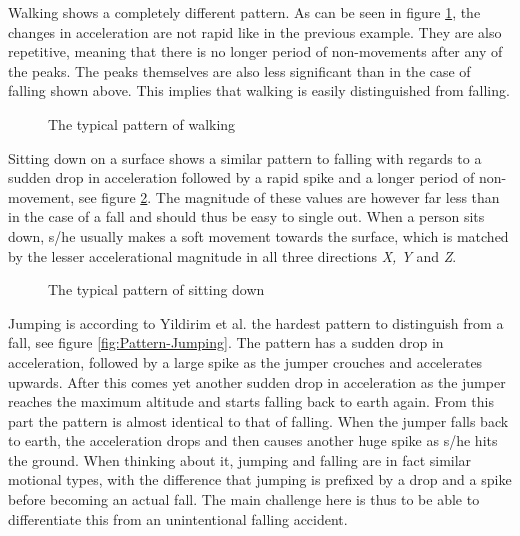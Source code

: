 \documentclass[12pt, a4paper, onecolumn]{article}
\begin{document}
	
	Walking shows a completely different pattern. As can be seen in figure \ref{fig:Pattern-Walking}, the changes in acceleration are not rapid like in the previous example. They are also repetitive, meaning that there is no longer period of non-movements after any of the peaks. The peaks themselves are also less significant than in the case of falling shown above. This implies that walking is easily distinguished from falling.
	
	\begin{figure}[H]
		\centering
		\caption{The typical pattern of walking}%
		\label{fig:Pattern-Walking}%
	\end{figure}
	
	
	 Sitting down on a surface shows a similar pattern to falling with regards to a sudden drop in acceleration followed by a rapid spike and a longer period of non-movement, see figure \ref{fig:Pattern-Sittin}. The magnitude of these values are however far less than in the case of a fall and should thus be easy to single out. When a person sits down, s/he usually makes a soft movement towards the surface, which is matched by the lesser accelerational magnitude in all three directions \textit{X, Y} and \textit{Z}.
	 
	 \begin{figure}[H]
	 	\centering
	 	\caption{The typical pattern of sitting down}%
	 	\label{fig:Pattern-Sittin}%
	 \end{figure}
	
	Jumping is according to Yildirim et al. the hardest pattern to distinguish from a fall, see figure \ref{fig:Pattern-Jumping}. The pattern has a sudden drop in acceleration, followed by a large spike as the jumper crouches and accelerates upwards. After this comes yet another sudden drop in acceleration as the jumper reaches the maximum altitude and starts falling back to earth again. From this part the pattern is almost identical to that of falling. When the jumper falls back to earth, the acceleration drops and then causes another huge spike as s/he hits the ground. When thinking about it, jumping and falling are in fact similar motional types, with the difference that jumping is prefixed by a drop and a spike before becoming an actual fall. The main challenge here is thus to be able to differentiate this from an unintentional falling accident.
	
\end{document}
